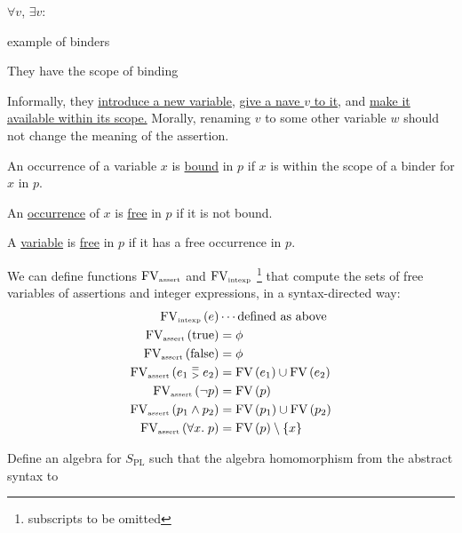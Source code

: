 \begin{enumcirc}
	\item
	$\forall v$, $\exists v$:
	\begin{enumrm}
		\item
		example of binders
		\item
		They have the scope of binding
		\item
		Informally, they
		\ul{introduce a new variable},
		\ul{give a nave $v$ to it}, and
		\ul{make it available within its scope.}
		Morally, renaming $v$ to some other variable $w$ should not change the meaning
		of the assertion.
	\end{enumrm}
	\item
	An occurrence of a variable $x$ is \ul{bound} in $p$ if $x$ is within the scope
	of a binder for $x$ in $p$.
	\item
	An \underline{occurrence} of $x$ is \underline{free} in $p$ if it is not bound.
	\item
	A \underline{variable} is \underline{free} in $p$ if it has a free occurrence
	in $p$.
	\item
	We can define functions $\textrm{FV}_{\textrm{\tiny assert}}$ and
	$\textrm{FV}_{\textrm{\tiny intexp}}$ \footnote{ subscripts to be omitted }
	that compute the sets of free variables of assertions and integer expressions,
	in a syntax-directed way:
	\begin{align*}
		\textrm{FV}_{\textrm{\tiny intexp}}\left(  e  \right)                           & \cdots                     \textrm{defined as above} \\
		\textrm{FV}_{\textrm{\tiny assert}}\left(  \textrm{true}  \right)                       & = \phi                                               \\
		\textrm{FV}_{\textrm{\tiny assert}}\left(  \textrm{false}  \right)                      & = \phi                                               \\
		\textrm{FV}_{\textrm{\tiny assert}}\left(  e_1 \;\substack{=\\>}\; e_2  \right) & = \textrm{FV}\left( e_1 \right) \cup \textrm{FV}\left( e_2 \right) \\
		\textrm{FV}_{\textrm{\tiny assert}}\left(  \neg p  \right)                      & = \textrm{FV}\left( p \right)                               \\
		\textrm{FV}_{\textrm{\tiny assert}}\left(  p_1 \wedge p_2  \right)              & = \textrm{FV}\left( p_1 \right) \cup \textrm{FV}\left( p_2 \right) \\
		\textrm{FV}_{\textrm{\tiny assert}}\left(  \forall x .\; p  \right)             & = \textrm{FV}\left( p \right) \setminus \left\{ x \right\}
	\end{align*}
	\begin{exercise}
		Define an algebra for $S_{\textrm{PL}}$ such that the algebra homomorphism from the abstract syntax to

\end{exercise}
\end{enumcirc}
